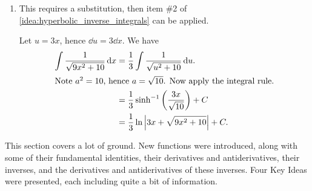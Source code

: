 \begin{example}
\begin{enumerate}
%

\item		This requires a substitution, then item \#2 of \autoref{idea:hyperbolic_inverse_integrals} can be applied.

Let $u = 3x$, hence $\dd u = 3\dd x$. We have 
\begin{align*}
	\int \frac{1}{\sqrt{9x^2+10}}\operatorname{d}\! x
	&= \frac13\int\frac{1}{\sqrt{u^2+10}}\operatorname{d}\! u.\\
	\intertext{Note \(a^2=10\), hence \(a = \sqrt{10}\). Now apply the integral rule.}
	 &= \frac13 \sinh^{-1}\left(\frac{3x}{\sqrt{10}}\right) + C \\
	 &= \frac13 \ln \left\lvert 3x+\sqrt{9x^2+10} \right\rvert+C.
\end{align*}
\end{enumerate}
\end{example}

This section covers a lot of ground. New functions were introduced, along with some of their fundamental identities, their derivatives and antiderivatives, their inverses, and the derivatives and antiderivatives of these inverses. Four Key Ideas were presented, each including quite a bit of information.

